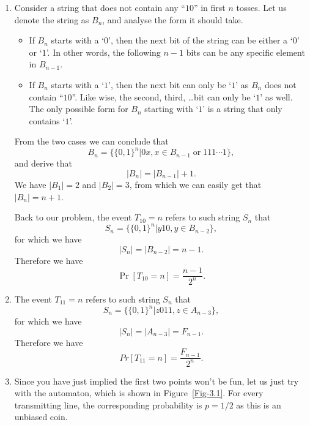 \documentclass[12pt,a4]{article}
\begin{document}
\begin{solution} \quad
      \begin{enumerate}
         \item Consider a string that does not contain any ``$10$'' in first $n$ tosses. Let us denote the string as $B_n$, and analyse the form it should take.
         \begin{itemize}
            \item If $B_n$ starts with a `$0$', then the next bit of the string can be either a `$0$' or `$1$'. In other words, the following $n-1$ bits can be any specific element in $B_{n-1}$.
            \item If $B_n$ starts with a `$1$', then the next bit can only be `$1$' as $B_n$ does not contain ``$10$''. Like wise, the second, third, \dots bit can only be `$1$' as well. The only possible form for $B_n$ starting with `$1$' is a string that only contains `$1$'.
         \end{itemize}
         From the two cases we can conclude that $$B_n=\{\{0,1\}^n|0x,x\in B_{n-1}\;\text{or}\;111\cdots1\},$$ and derive that 
         $$
         |B_n|=|B_{n-1}|+1.
         $$
         We have $|B_1|=2$ and $|B_2|=3$, from which we can easily get that $|B_n|=n+1$.

         Back to our problem, the event $T_{10}=n$ refers to such string $S_n$ that $$S_n=\{\{0,1\}^n|y10,y\in B_{n-2}\},$$ for which we have $$|S_n|=|B_{n-2}|=n-1.$$
        Therefore we have $$\Pr[T_{10} = n]=\frac{n-1}{2^n}.$$

        \item The event $T_{11}=n$ refers to such string $S_n$ that $$S_n=\{\{0,1\}^n|z011,z\in A_{n-3}\},$$ for which we have $$|S_n|=|A_{n-3}|=F_{n-1}.$$
        Therefore we have $$Pr[T_{11}=n]=\frac{F_{n-1}}{2^n}.$$

        \item Since you have just implied the first two points won't be fun, let us just try with the automaton, which is shown in Figure~\ref{Fig-3.1}. For every transmitting line, the corresponding probability is $p=1/2$ as this is an unbiased coin.
        

\end{enumerate}
\end{solution}
\end{document}
